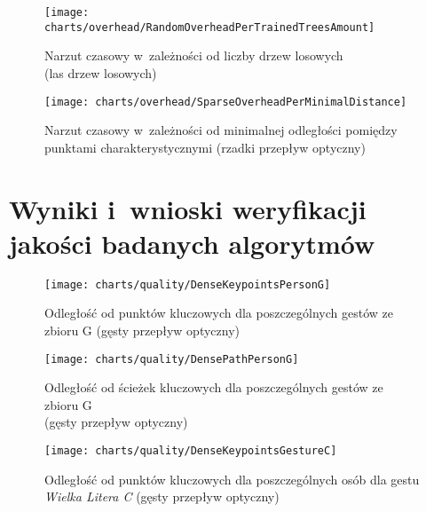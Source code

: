     \begin{figure}[!ht]
      \centering
      \texttt{[image: charts/overhead/RandomOverheadPerTrainedTreesAmount]}
      \caption[Narzut czasowy w~zależności od liczby drzew losowych]
              {Narzut czasowy w~zależności od liczby drzew losowych\\(las drzew losowych)}
      \label{fig:SpecialisedRandomOverhead}
    \end{figure}

    \begin{figure}[!ht]
      \centering
      \texttt{[image: charts/overhead/SparseOverheadPerMinimalDistance]}
      \caption[Narzut czasowy w~zależności od minimalnej odległości pomiędzy punktami charakterystycznymi]
              {Narzut czasowy w~zależności od minimalnej odległości pomiędzy punktami charakterystycznymi (rzadki przepływ optyczny)}
      \label{fig:SpecialisedSparseOverhead}
    \end{figure}

  \section{Wyniki i~wnioski weryfikacji jakości badanych algorytmów}\label{Section_Quality}

    \begin{figure}[!ht]
      \centering
      \texttt{[image: charts/quality/DenseKeypointsPersonG]}
      \caption[Odległość od punktów kluczowych dla poszczególnych gestów]
              {Odległość od punktów kluczowych dla poszczególnych gestów ze zbioru G (gęsty przepływ optyczny)}
      \label{fig:DenseKeypointsPersonG}
    \end{figure}

    \begin{figure}[!ht]
      \centering
      \texttt{[image: charts/quality/DensePathPersonG]}
      \caption[Odległość od ścieżek kluczowych dla poszczególnych gestów]
              {Odległość od ścieżek kluczowych dla poszczególnych gestów ze zbioru G\\(gęsty przepływ optyczny)}
      \label{fig:DensePathPersonG}
    \end{figure}

    \newpage
    \begin{figure}[!ht]
      \centering
      \texttt{[image: charts/quality/DenseKeypointsGestureC]}
      \caption[Odległość od punktów kluczowych dla poszczególnych osób dla gestu C]
              {Odległość od punktów kluczowych dla poszczególnych osób dla gestu\\\textit{Wielka Litera C} (gęsty przepływ optyczny)}
      \label{fig:DenseKeypointsGestureC}
    \end{figure}

